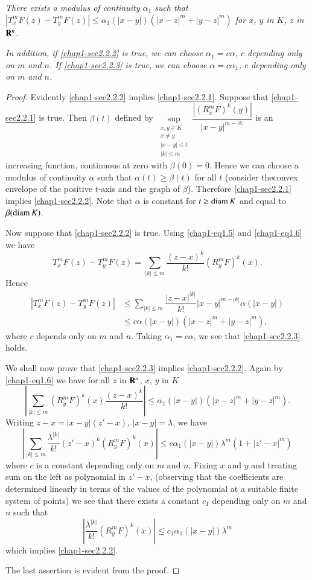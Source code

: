 \subsubsection{}\label{chap1-sec2.2.3}
{\em There exists a modulus of continuity $\alpha_{1}$ such that $|T^{m}_{x}F(z)-T^{m}_{y}F(z)|\leq \alpha_{1}(|x-y|)(|x-z|^{m}+|y-z|^{m})$ for $x$, $y$ in $K$, $z$ in $\mathbf{R}^{n}$.}

{\em In addition, if \eqref{chap1-sec2.2.2} is true, we can choose $\alpha_{1}=c\alpha$, $c$ depending only on $m$ and $n$. If \eqref{chap1-sec2.2.3} is true, we can choose $\alpha=c\alpha_{1}$, $c$ depending only on $m$ and $n$.}

\begin{proof}
Evidently \eqref{chap1-sec2.2.2} implies \eqref{chap1-sec2.2.1}. Suppose that \eqref{chap1-sec2.2.1} is true. Then $\beta(t)$ defined by $\sup\limits_{\substack{x,y\in K\\ x\neq y\\ |x-y|\leq t\\ |k|\leq m}}\dfrac{|(R^{m}_{x}F)^{k}(y)|}{|x-y|^{m-|k|}}$ is an increasing function, continuous at zero with $\beta(0)=0$. Hence we can choose a modulus of continuity $\alpha$ such that $\alpha(t)\geq \beta(t)$ for all $t$ (consider the\pageoriginale convex envelope of the positive $t$-axis and the graph of $\beta$). Therefore \eqref{chap1-sec2.2.1} implies \eqref{chap1-sec2.2.2}. Note that $\alpha$ is constant for $t\geq \operatorname{diam} K$ and equal to $\beta(\operatorname{diam} K)$.

Now suppose that \eqref{chap1-sec2.2.2} is true. Using \eqref{chap1-eq1.5} and \eqref{chap1-eq1.6} we have
$$
T^{m}_{x}F(z)-T^{m}_{y}F(z)=\sum\limits_{|k|\leq m}\dfrac{(z-x)^{k}}{k!}(R^{m}_{y}F)^{k}(x).
$$
Hence
\begin{align*}
|T^{m}_{x}F(z)-T^{m}_{y}F(z)| &\leq \sum\limits_{|k|\leq m}\dfrac{|z-x|^{|k|}}{k!}|x-y|^{m-|k|}\alpha(|x-y|)\\
&\leq c\alpha (|x-y|)(|x-z|^{m}+|y-z|^{m}),
\end{align*}
where $c$ depends only on $m$ and $n$. Taking $\alpha_{1}=c\alpha$, we see that \eqref{chap1-sec2.2.3} holds.

We shall now prove that \eqref{chap1-sec2.2.3} implies \eqref{chap1-sec2.2.2}. Again by \eqref{chap1-eq1.6} we have for all $z$ in $\mathbf{R}^{n}$, $x$, $y$ in $K$
$$
\left|\sum\limits_{|k|\leq m}(R^{m}_{y}F)^{k}(x)\dfrac{(z-x)^{k}}{k!}\right|\leq \alpha_{1}(|x-y|)(|x-z|^{m}+|y-z|^{m}).
$$
Writing $z-x=|x-y|(z'-x)$, $|x-y|=\lambda$, we have
$$
\left|\sum\limits_{|k|\leq m}\dfrac{\lambda^{|k|}}{k!}(z'-x)^{k}(R^{m}_{y}F)^{k}(x)\right|\leq c\alpha_{1}(|x-y|)\lambda^{m}(1+|z'-x|^{m})
$$
where $c$ is a constant depending only on $m$ and $n$. Fixing $x$ and $y$ and treating sum on the left as polynomial in $z'-x$, (observing that the coefficients are determined linearly in terms of the values of the polynomial at a suitable finite system of points) we see that there exists a constant $c_{1}$ depending only on $m$ and $n$ such that
$$
\left|\dfrac{\lambda^{|k|}}{k!}(R^{m}_{y}F)^{k}(x)\right|\leq c_{1}\alpha_{1}(|x-y|)\lambda^{m}
$$
which implies \eqref{chap1-sec2.2.2}.

The last assertion is evident from the proof.
\end{proof}

